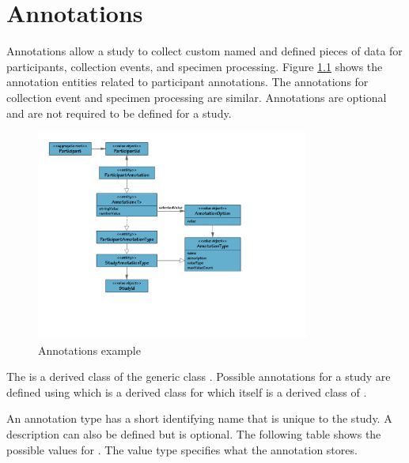 \chapter{Annotations}
\label{chap:annotations}

Annotations allow a study to collect custom named and defined pieces of data
for participants, collection events, and specimen processing. Figure
\ref{fig:annotation-example} shows the annotation entities related to
participant annotations. The annotations for collection event and specimen
processing are similar. Annotations are optional and are not required to be
defined for a study.

\begin{figure}[H]
  \centering
  \includegraphics[trim={10mm 45mm 68mm 10mm}, clip,
    width=0.8\textwidth]{images/annotation-example}
  \caption{Annotations example}
  \label{fig:annotation-example}
\end{figure}

The  is a derived class of the generic class
. Possible annotations for a study are defined using
 which is a derived class for
 which itself is a derived class of
.

An annotation type has a short identifying name that is unique to the study. A
description can also be defined but is optional. The following table shows the
possible values for . The value type specifies what the
annotation stores.

